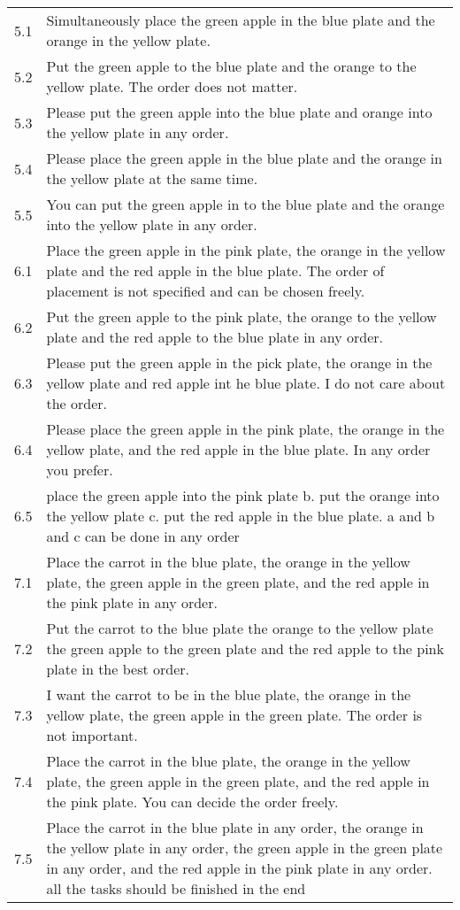 \documentclass{article}
\begin{document}
\begin{table*}[!tbh]
\begin{tabular}{cp{14cm}}
5.1 &  Simultaneously place the green apple in the blue plate and the orange in the yellow plate. \\
5.2 & Put the green apple to the blue plate and the orange to the yellow plate. The order does not matter.\\
5.3 & Please put the green apple into the blue plate and orange into the yellow plate in any order.\\
5.4 & Please place the green apple in the blue plate and the orange in the yellow plate at the same time.\\
5.5& You can put the green apple in to the blue plate and the orange into the yellow plate in any order.\\
       \hline
 6.1 & Place the green apple in the pink plate, the orange in the yellow plate and the red apple in the blue plate. The order of placement is not specified and can be chosen freely. \\
 6.2 & Put the green apple to the pink plate, the orange to the yellow plate and the red apple to the blue plate in any order.\\
 6.3 & Please put the green apple in the pick plate, the orange in the yellow plate and red apple int he blue plate. I do not care about the order.\\
 6.4 & Please place the green apple in the pink plate, the orange in the yellow plate, and the red apple in the blue plate. In any order you prefer.\\
6.5 &  place the green apple into the pink plate b. put the orange into the yellow plate c. put the red apple in the blue plate. a and b and c can be done in any order \\
       \hline
7.1 &  Place the carrot in the blue plate, the orange in the yellow plate, the green apple in the green plate, and the red apple in the pink plate in any order. \\
7.2 & Put the carrot to the blue plate the orange to the yellow plate the green apple to the green plate and the red apple to the pink plate in the best order.\\
7.3 & I want the carrot to be in the blue plate, the orange in the yellow plate, the green apple in the green plate. The order is not important.\\
7.4 & Place the carrot in the blue plate, the orange in the yellow plate, the green apple in the green plate, and the red apple in the pink plate. You can decide the order freely. \\
7.5 & Place the carrot in the blue plate in any order, the orange in the yellow plate in any order, the green apple in the green plate in any order, and the red apple in the pink plate in any order. all the tasks should be finished in the end\\

\end{tabular}
\end{table*}
\end{document}
